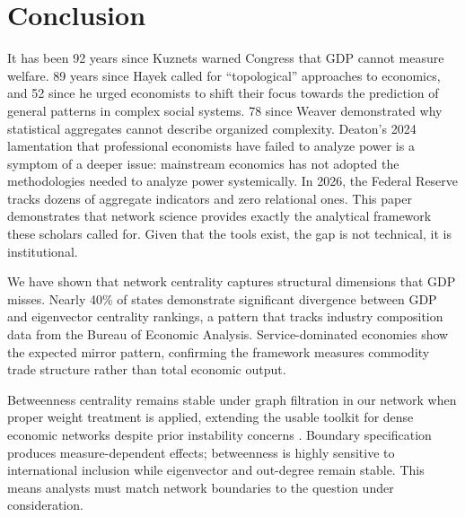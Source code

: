 \documentclass[12pt,oneside]{book}
\begin{document}
\FloatBarrier
\chapter{Conclusion}

It has been 92 years since Kuznets warned Congress that GDP cannot measure welfare. 89 years since Hayek called for ``topological'' approaches to economics, and 52 since he urged economists to shift their focus towards the prediction of general patterns in complex social systems. 78 since Weaver demonstrated why statistical aggregates cannot describe organized complexity. Deaton's 2024 lamentation that professional economists have failed to analyze power is a symptom of a deeper issue: mainstream economics has not adopted the methodologies needed to analyze power systemically. In 2026, the Federal Reserve tracks dozens of aggregate indicators and zero relational ones. This paper demonstrates that network science provides exactly the analytical framework these scholars called for. Given that the tools exist, the gap is not technical, it is institutional. 

We have shown that network centrality captures structural dimensions that GDP misses. Nearly 40\% of states demonstrate significant divergence between GDP and eigenvector centrality rankings, a pattern that tracks industry composition data from the Bureau of Economic Analysis. Service-dominated economies show the expected mirror pattern, confirming the framework measures commodity trade structure rather than total economic output. 

Betweenness centrality remains stable under graph filtration in our network when proper weight treatment is applied, extending the usable toolkit for dense economic networks despite prior instability concerns \cite{segarra_stability_2015}. Boundary specification produces measure-dependent effects; betweenness is highly sensitive to international inclusion while eigenvector and out-degree remain stable. This means analysts must match network boundaries to the question under consideration. 
\end{document}
